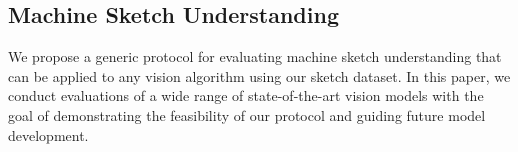 \documentclass{article}
\begin{document}




\subsection{Machine Sketch Understanding}

We propose a generic protocol for evaluating machine sketch understanding that can be applied to any vision algorithm using our sketch dataset. 
In this paper, we conduct evaluations of a wide range of state-of-the-art vision models with the goal of demonstrating the feasibility of our protocol and guiding future model development. 
\end{document}
